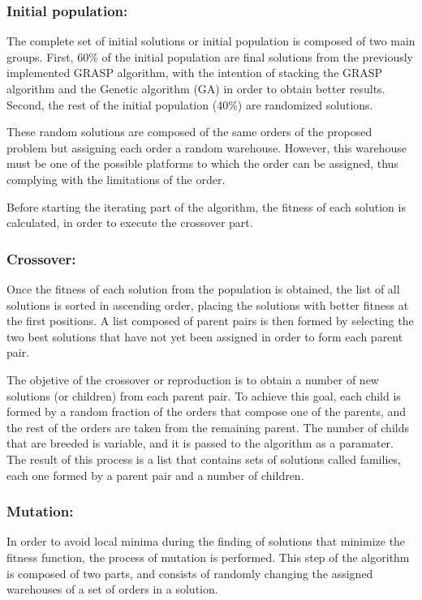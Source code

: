 \documentclass[letterpaper]{article} %
\begin{document}
\subsubsection*{Initial population:}
The complete set of initial solutions or initial population is composed of two main groups. First, 60\% of the initial population are final solutions from the previously implemented GRASP algorithm, with the intention of stacking the GRASP algorithm and the Genetic algorithm (GA) in order to obtain better results. Second, the rest of the initial population (40\%) are randomized solutions.

These random solutions are composed of the same orders of the proposed problem but assigning each order a random warehouse. However, this warehouse must be one of the possible platforms to which the order can be assigned, thus complying with the limitations of the order.

Before starting the iterating part of the algorithm, the fitness of each solution is calculated, in order to execute the crossover part.

\subsubsection*{Crossover:}
Once the fitness of each solution from the population is obtained, the list of all solutions is sorted in ascending order, placing the solutions with better fitness at the first positions. A list composed of parent pairs is then formed by selecting the two best solutions that have not yet been assigned in order to form each parent pair.

The objetive of the crossover or reproduction is to obtain a number of new solutions (or children) from each parent pair. To achieve this goal, each child is formed by a random fraction of the orders that compose one of the parents, and the rest of the orders are taken from the remaining parent. The number of childs that are breeded is variable, and it is passed to the algorithm as a paramater. The result of this process is a list that contains sets of solutions called families, each one formed by a parent pair and a number of children.

\subsubsection*{Mutation:}
In order to avoid local minima during the finding of solutions that minimize the fitness function, the process of mutation is performed. This step of the algorithm is composed of two parts, and consists of randomly changing the assigned warehouses of a set of orders in a solution.
\end{document}
